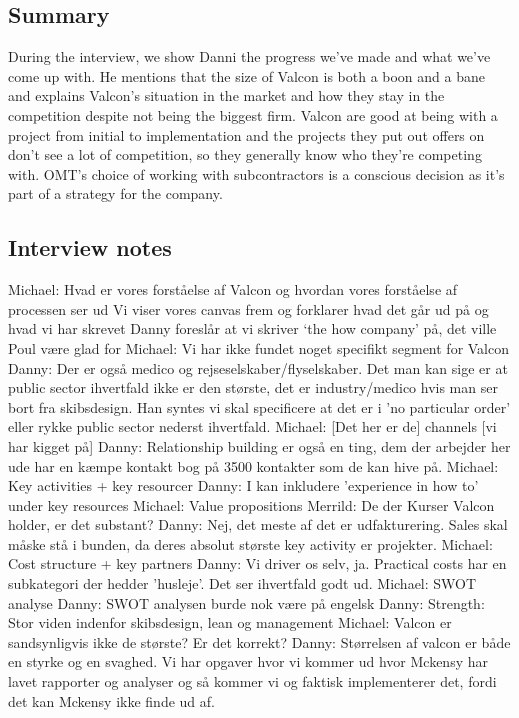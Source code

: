\label{app:danni_inline}
\subsection{Summary}
During the interview, we show Danni the progress we've made and what we've come up with. 
He mentions that the size of Valcon is both a boon and a bane and explains Valcon's situation in the market and how they stay in the competition despite not being the biggest firm. 
Valcon are good at being with a project from initial to implementation and the projects they put out offers on don't see a lot of competition, so they generally know who they're competing with. 
OMT's choice of working with subcontractors is a conscious decision as it's part of a strategy for the company.

\subsection{Interview notes}
Michael: Hvad er vores forståelse af Valcon og hvordan vores forståelse af processen ser ud
Vi viser vores canvas frem og forklarer hvad det går ud på og hvad vi har skrevet
Danny foreslår at vi skriver ‘the how company’ på, det ville Poul være glad for
Michael: Vi har ikke fundet noget specifikt segment for Valcon
Danny: Der er også medico og rejseselskaber/flyselskaber. Det man kan sige er at public sector ihvertfald ikke er den største, det er industry/medico hvis man ser bort fra skibsdesign. Han syntes vi skal specificere at det er i 'no particular order' eller rykke public sector nederst ihvertfald.
Michael: [Det her er de] channels [vi har kigget på]
Danny: Relationship building er også en ting, dem der arbejder her ude har en kæmpe kontakt bog på 3500 kontakter som de kan hive på.
Michael: Key activities + key resourcer
Danny: I kan inkludere 'experience in how to' under key resources
Michael: Value propositions
Merrild: De der Kurser Valcon holder, er det substant?
Danny: Nej, det meste af det er udfakturering. Sales skal måske stå i bunden, da deres absolut største key activity er projekter.
Michael: Cost structure + key partners
Danny: Vi driver os selv, ja. Practical costs har en subkategori der hedder 'husleje'. Det ser ihvertfald godt ud.
Michael: SWOT analyse
Danny: SWOT analysen burde nok være på engelsk
Danny: Strength: Stor viden indenfor skibsdesign, lean og management
Michael: Valcon er sandsynligvis ikke de største? Er det korrekt?
Danny: Størrelsen af valcon er både en styrke og en svaghed. Vi har opgaver hvor vi kommer ud hvor Mckensy har lavet rapporter og analyser og så kommer vi og faktisk implementerer det, fordi det kan Mckensy ikke finde ud af.
